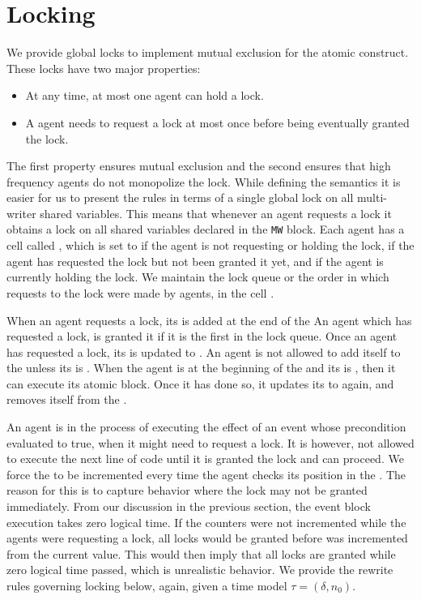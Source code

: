 \section[h]{Locking}
\label{sect:locking}
We provide global locks to implement mutual exclusion for the atomic construct. 
	These locks have two major properties:
    \begin{itemize}
\item At any time, at most one agent can hold a lock. 
\item A agent needs to request a lock at most once before being eventually granted the lock. 
\end{itemize}
The first property ensures mutual exclusion and the second ensures that high frequency agents do not monopolize the lock. 
While defining the semantics it is easier for us to present the rules in terms of a single global lock on all multi-writer shared variables. This means that whenever an agent requests a lock it obtains a lock on all shared variables declared in the \verb|MW| block. Each agent has a cell called , which is set to  if the agent is not requesting or holding the lock,  if the agent has requested the lock but not been granted it yet, and  if the agent is currently holding the lock. We maintain the lock queue or the order in which requests to the lock were made by agents, in the cell . 

When an agent requests a lock, its  is added at the end of the  An agent which has requested a lock, is granted it if it is the first in the lock queue. Once an agent has requested a lock, its  is updated to . An agent is not allowed to add itself to the  unless its  is . When the agent is at the beginning of the  and its  is , then it can execute its atomic block. Once it has done so, it updates its  to  again, and removes itself from the . 

An agent is in the process of executing the effect of an event whose precondition evaluated to true, when it might need to request a lock. It is however, not allowed to execute the next line of code until it is granted the lock and can proceed. We force the  to be incremented every time the agent checks its position in the . The reason for this is to capture behavior where the lock may not be granted immediately. From our discussion in the previous section, the event block execution takes zero logical time. If the counters were not incremented while the agents were requesting a lock, all locks would be granted before  was incremented from the current value. This would then imply that all locks are granted while zero logical time passed, which is unrealistic behavior. We provide the rewrite rules governing locking below, again, given a time model $\tau = (\delta,n_0)$. 

